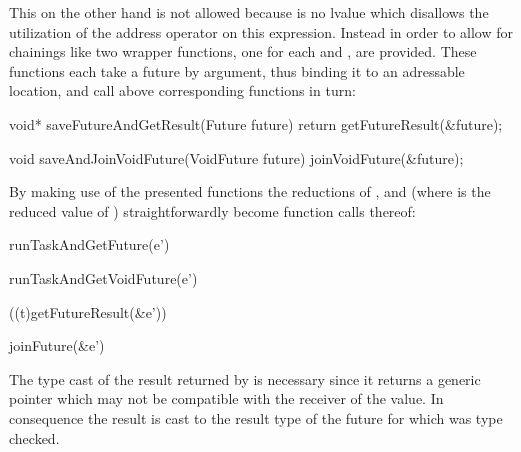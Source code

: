 This on the other hand is not allowed because  is no lvalue\cite[pp.~147-148]{CPrimerPlus} which disallows the utilization of the address operator on this expression. Instead in order to allow for chainings like  two wrapper functions, one for each  and , are provided. These functions each take a future by argument, thus binding it to an adressable location, and call above corresponding functions in turn:
\begin{ccode}
void* saveFutureAndGetResult(Future future) { 
  return getFutureResult(&future); 
}

void saveAndJoinVoidFuture(VoidFuture future) { 
  joinVoidFuture(&future); 
}
\end{ccode}

By making use of the presented functions the reductions of ,  and  (where  is the reduced value of ) straightforwardly become function calls thereof:

\begin{minipage}{0.5\textwidth}
\begin{ccode}
runTaskAndGetFuture(e')
\end{ccode}
\end{minipage}
\begin{minipage}{0.5\textwidth}
\begin{ccode}
runTaskAndGetVoidFuture(e')
\end{ccode}
\end{minipage}

\begin{minipage}{0.5\textwidth}
\begin{ccode}
((t)getFutureResult(&e'))
\end{ccode}
\end{minipage}
\begin{minipage}{0.5\textwidth}
\begin{ccode}
joinFuture(&e')
\end{ccode}
\end{minipage}

The type cast of the result returned by  is necessary since it returns a generic pointer  which may not be compatible with the receiver of the value. In consequence the result is cast to the result type of the future for which  was type checked.


